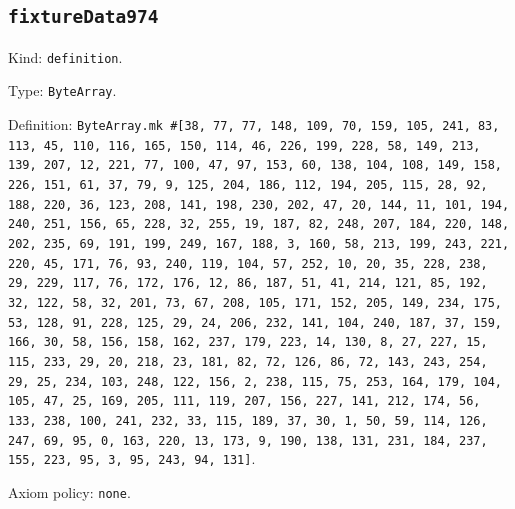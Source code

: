 \documentclass[11pt]{article}
\begin{document}
\subsection*{\texttt{fixtureData974}}
\noindent Kind: \texttt{definition}.\par
\noindent Type: \texttt{ByteArray}.\par
\noindent Definition: \texttt{ByteArray.mk \#[38, 77, 77, 148, 109, 70, 159, 105, 241, 83, 113, 45, 110, 116, 165, 150, 114, 46, 226, 199, 228, 58, 149, 213, 139, 207, 12, 221, 77, 100, 47, 97, 153, 60, 138, 104, 108, 149, 158, 226, 151, 61, 37, 79, 9, 125, 204, 186, 112, 194, 205, 115, 28, 92, 188, 220, 36, 123, 208, 141, 198, 230, 202, 47, 20, 144, 11, 101, 194, 240, 251, 156, 65, 228, 32, 255, 19, 187, 82, 248, 207, 184, 220, 148, 202, 235, 69, 191, 199, 249, 167, 188, 3, 160, 58, 213, 199, 243, 221, 220, 45, 171, 76, 93, 240, 119, 104, 57, 252, 10, 20, 35, 228, 238, 29, 229, 117, 76, 172, 176, 12, 86, 187, 51, 41, 214, 121, 85, 192, 32, 122, 58, 32, 201, 73, 67, 208, 105, 171, 152, 205, 149, 234, 175, 53, 128, 91, 228, 125, 29, 24, 206, 232, 141, 104, 240, 187, 37, 159, 166, 30, 58, 156, 158, 162, 237, 179, 223, 14, 130, 8, 27, 227, 15, 115, 233, 29, 20, 218, 23, 181, 82, 72, 126, 86, 72, 143, 243, 254, 29, 25, 234, 103, 248, 122, 156, 2, 238, 115, 75, 253, 164, 179, 104, 105, 47, 25, 169, 205, 111, 119, 207, 156, 227, 141, 212, 174, 56, 133, 238, 100, 241, 232, 33, 115, 189, 37, 30, 1, 50, 59, 114, 126, 247, 69, 95, 0, 163, 220, 13, 173, 9, 190, 138, 131, 231, 184, 237, 155, 223, 95, 3, 95, 243, 94, 131]}.\par
\noindent Axiom policy: \texttt{none}.\par
\end{document}
